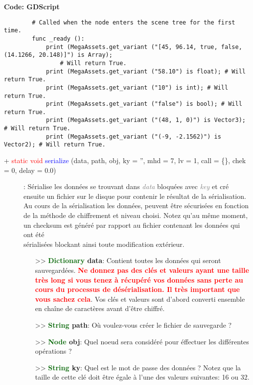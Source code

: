\documentclass[a4paper, 11pt]{article}
\begin{document}
	\textbf{Code: GDScript}
	\begin{lstlisting}
		# Called when the node enters the scene tree for the first time.
		func _ready ():
			print (MegaAssets.get_variant ("[45, 96.14, true, false, (14.1266, 20.148)]") is Array);
				# Will return True.
			print (MegaAssets.get_variant ("58.10") is float); # Will return True.
			print (MegaAssets.get_variant ("10") is int); # Will return True.
			print (MegaAssets.get_variant ("false") is bool); # Will return True.
			print (MegaAssets.get_variant ("(48, 1, 0)") is Vector3); # Will return True.
			print (MegaAssets.get_variant ("(-9, -2.1562)") is Vector2); # Will return True.
	\end{lstlisting}
	\begin{description}
		\item [+ \textcolor{red}{static void} \textcolor{blue}{serialize} (data, path, obj, ky = '', 
		mhd = 7, lv = 1, call = \{\}, chek = 0, delay = 0.0)]: Sérialise les données se trouvant dans 
		\textit{\textcolor{gray}{data}} bloquées avec \textit{\textcolor{gray}{key}} et cré ensuite un 
		fichier sur le disque pour contenir le résultat de la sérialisation. Au cours de la sérialisation 
		les données, peuvent être sécurisées en fonction de la méthode de chiffrement et niveau choisi. 
		Notez qu'au même moment, un checksum est généré par rapport au fichier contenant les données qui 
		ont été \\sérialisées blockant ainsi toute modification extérieur.
		\begin{itemize}
			\item [>> \textbf{\textcolor{darkgreen}{Dictionary} data}:] Contient toutes les données qui 
			seront sauvegardées. \textbf{\textcolor{red}{Ne donnez pas des clés et valeurs ayant une taille 
			très long si vous tenez à récupéré vos données sans perte au cours du processus de 
			désérialisation. Il très important que vous sachez cela}}. Vos clés et valeurs sont d'abord
			converti ensemble en chaîne de caractères avant d'être chiffré.
			\item [>> \textbf{\textcolor{darkgreen}{String} path}:] Où voulez-vous créer le fichier de 
			sauvegarde ?
			\item [>> \textbf{\textcolor{darkgreen}{Node} obj}:] Quel noeud sera considéré pour éffectuer
			les différentes opérations ?
			\item [>> \textbf{\textcolor{darkgreen}{String} ky}:] Quel est le mot de passe des données ? 
			Notez que la taille de cette clé doit être égale à l'une des valeurs suivantes: 16 ou 32.

\end{itemize}
\end{description}
\end{document}
